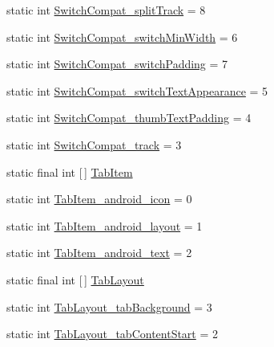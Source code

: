 \begin{DoxyCompactItemize}
\item 
static int \hyperlink{classandroid_1_1support_1_1v7_1_1cardview_1_1R_1_1styleable_adb2fe94b52e4196f86533c6c9620503e}{Switch\+Compat\+\_\+split\+Track} = 8
\item 
static int \hyperlink{classandroid_1_1support_1_1v7_1_1cardview_1_1R_1_1styleable_ae69add4745baa57c245f73ea9040dcec}{Switch\+Compat\+\_\+switch\+Min\+Width} = 6
\item 
static int \hyperlink{classandroid_1_1support_1_1v7_1_1cardview_1_1R_1_1styleable_a282efd9317f1b44049acf1c53d892763}{Switch\+Compat\+\_\+switch\+Padding} = 7
\item 
static int \hyperlink{classandroid_1_1support_1_1v7_1_1cardview_1_1R_1_1styleable_aee6b23536fd36623a9dd00ddd13596e8}{Switch\+Compat\+\_\+switch\+Text\+Appearance} = 5
\item 
static int \hyperlink{classandroid_1_1support_1_1v7_1_1cardview_1_1R_1_1styleable_ab38025adbf83386aabd5df58f36bd8cb}{Switch\+Compat\+\_\+thumb\+Text\+Padding} = 4
\item 
static int \hyperlink{classandroid_1_1support_1_1v7_1_1cardview_1_1R_1_1styleable_a0694f9f648cee027249017c5733efdb5}{Switch\+Compat\+\_\+track} = 3
\item 
static final int \mbox{[}$\,$\mbox{]} \hyperlink{classandroid_1_1support_1_1v7_1_1cardview_1_1R_1_1styleable_ac405d1f61871d7d972e9ba19778ffd5c}{Tab\+Item}
\item 
static int \hyperlink{classandroid_1_1support_1_1v7_1_1cardview_1_1R_1_1styleable_aa4f4bd92f5fcdb273f04a20e103a944b}{Tab\+Item\+\_\+android\+\_\+icon} = 0
\item 
static int \hyperlink{classandroid_1_1support_1_1v7_1_1cardview_1_1R_1_1styleable_aad53ae51e3318cabf258aa1e281c34fe}{Tab\+Item\+\_\+android\+\_\+layout} = 1
\item 
static int \hyperlink{classandroid_1_1support_1_1v7_1_1cardview_1_1R_1_1styleable_ad0e92cbb6d2f273d7c8007f245cccb84}{Tab\+Item\+\_\+android\+\_\+text} = 2
\item 
static final int \mbox{[}$\,$\mbox{]} \hyperlink{classandroid_1_1support_1_1v7_1_1cardview_1_1R_1_1styleable_afa0dc9366603eaec9e38d99273ba8512}{Tab\+Layout}
\item 
static int \hyperlink{classandroid_1_1support_1_1v7_1_1cardview_1_1R_1_1styleable_a92606b2725987ce07684e8a6f7e3e136}{Tab\+Layout\+\_\+tab\+Background} = 3
\item 
static int \hyperlink{classandroid_1_1support_1_1v7_1_1cardview_1_1R_1_1styleable_ad3da5de5c86701f6df05c289f3be2530}{Tab\+Layout\+\_\+tab\+Content\+Start} = 2

\end{DoxyCompactItemize}
